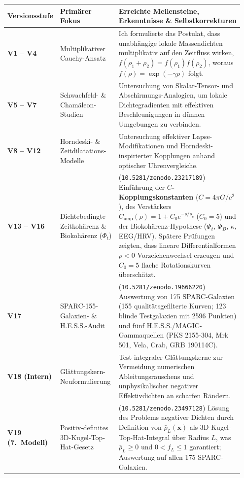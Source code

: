 \documentclass[10pt,a4paper]{article}
\begin{document}
\begin{center}\vspace{-2pt}
{\footnotesize
\begin{tabular}{@{}>{\bfseries\color{navy}}p{0.14\linewidth}p{0.25\linewidth}p{0.56\linewidth}@{}}
\toprule
Versionsstufe & Prim\"arer Fokus & Erreichte Meilensteine, Erkenntnisse \& Selbstkorrekturen \\
\midrule
V1 -- V4 & Multiplikativer Cauchy-Ansatz & Ich formulierte das Postulat, dass unabh\"angige lokale Massendichten multiplikativ auf den Zeitfluss wirken, $f(\rho_1+\rho_2)=f(\rho_1)f(\rho_2)$, woraus $f(\rho)=\exp(-\gamma\rho)$ folgt. \\
V5 -- V7 & Schwachfeld- \& Cham\"aleon-Studien & Untersuchung von Skalar-Tensor- und Abschirmungs-Analogien, um lokale Dichtegradienten mit effektiven Beschleunigungen in d\"unnen Umgebungen zu verbinden. \\
V8 -- V12 & Horndeski- \& Zeitdilatations-Modelle & Untersuchung effektiver Lapse-Modifikationen und Horndeski-inspirierter Kopplungen anhand optischer Uhrenvergleiche. \\
V13 -- V16 & Dichtebedingte Zeitkoh\"arenz \& Biokoh\"arenz ($\Phi_t$) & (\texttt{10.5281/zenodo.23217189}) Einf\"uhrung der \textbf{$C$-Kopplungskonstanten} ($C=4\pi G/c^2$), des Verst\"arkers $C_{\text{amp}}(\rho)=1+C_0 e^{-\rho/\rho_c}$ ($C_0=5$) und der Biokoh\"arenz-Hypothese ($\Phi_t$, $\Phi_B$, $\kappa$, EEG/HRV). Sp\"atere Pr\"ufungen zeigten, dass lineare Differentialformen $\rho<0$-Vorzeichenwechsel erzeugen und $C_0=5$ flache Rotationskurven \"ubersch\"atzt. \\
V17 & SPARC-155-Galaxien- \& H.E.S.S.-Audit & (\texttt{10.5281/zenodo.19666220}) Auswertung von 175 SPARC-Galaxien (155 qualit\"atsgefilterte Kurven; 123 blinde Testgalaxien mit 2596 Punkten) und f\"unf H.E.S.S./MAGIC-Gammaquellen (PKS 2155-304, Mrk 501, Vela, Crab, GRB 190114C). \\
V18 (Intern) & Gl\"attungskern-Neuformulierung & Test integraler Gl\"attungskerne zur Vermeidung numerischen Ableitungsrauschens und unphysikalischer negativer Effektivdichten an scharfen R\"andern. \\
V19 (7.\ Modell) & Positiv-definites 3D-Kugel-Top-Hat-Gesetz & (\texttt{10.5281/zenodo.23497128}) L\"osung des Problems negativer Dichten durch Definition von $\bar{\rho}_L(\mathbf{x})$ als 3D-Kugel-Top-Hat-Integral \"uber Radius $L$, was $\bar{\rho}_L\ge 0$ und $0<f_L\le 1$ garantiert; Auswertung auf allen 175 SPARC-Galaxien. \\

\end{tabular}}
\end{center}
\end{document}
